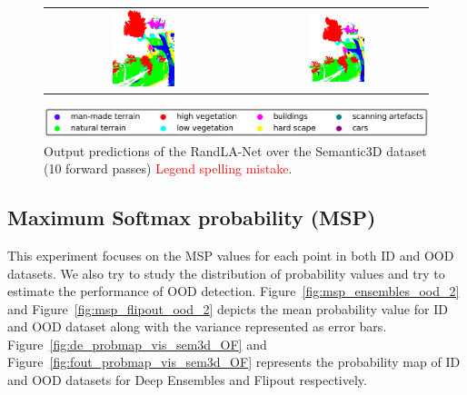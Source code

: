 \begin{figure}[h!]
\begin{tabular}{cc}
            \includegraphics[width=0.33\textwidth, height=0.18\textheight]{images/ood_imgs/fout_sem3d/fout_3.pdf}&
            \includegraphics[width=0.33\textwidth, height=0.18\textheight]{images/sem3d_of/fout_sem3d_of_3.pdf}\\
        \end{tabular}
        \includegraphics[scale=0.45]{images/legend.png}
        \caption{Output predictions of the RandLA-Net over the Semantic3D dataset (10 forward passes) \textcolor{red}{Legend spelling mistake}.}
        \label{fig:flipout_vis_sem3d_OF}
    \end{figure}   
    \FloatBarrier


    \subsection{Maximum Softmax probability (MSP)}
    This experiment focuses on the MSP values for each point in both ID and OOD datasets.
    We also try to study the distribution of probability values and try to estimate the performance of OOD detection.
    Figure~\ref{fig:msp_ensembles_ood_2} and Figure~\ref{fig:msp_flipout_ood_2} depicts the mean probability value for ID and OOD dataset along with the variance represented as error bars.
    Figure~\ref{fig:de_probmap_vis_sem3d_OF} and Figure~\ref{fig:fout_probmap_vis_sem3d_OF} represents the probability map of ID and OOD datasets for Deep Ensembles and Flipout respectively.

